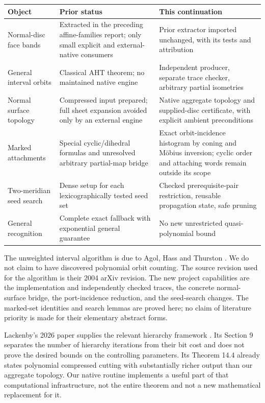 \documentclass[11pt,a4paper]{article}
\theoremstyle{definition}\newtheorem{definition}[theorem]{Definition}
\theoremstyle{remark}\newtheorem{remark}[theorem]{Remark}
\begin{document}
\begin{center}\small
\begin{tabularx}{\textwidth}{@{}p{}XX@{}}
\toprule
Object & Prior status & This continuation\\\midrule
Normal-disc face bands & Extracted in the preceding affine-families report;
only small explicit and external-native consumers & Prior extractor imported
unchanged, with its tests and attribution\\
General interval orbits & Classical AHT theorem; no maintained native engine &
Independent producer, separate trace checker, arbitrary partial isometries\\
Normal surface topology & Compressed input prepared; full sheet expansion
avoided only by an external engine & Native aggregate topology and supplied-disc
certificate, with explicit ambient preconditions\\
Marked attachments & Special cyclic/dihedral formulas and unresolved arbitrary
partial-map bridge & Exact orbit-incidence histogram by coning and M\"obius
inversion; cyclic order and attaching words remain outside its scope\\
Two-meridian seed search & Dense setup for each lexicographically tested seed set &
Checked prerequisite-pair restriction, reusable propagation state, safe pruning\\
General recognition & Complete exact fallback with exponential general guarantee &
No new unrestricted quasi-polynomial bound\\\bottomrule
\end{tabularx}
\end{center}

The unweighted interval algorithm is due to Agol, Hass and Thurston
\cite{aht}. We do not claim to have discovered polynomial orbit counting.
The source revision used for the algorithm is their 2004 arXiv revision.
The new project capabilities are the implementation and independently checked
traces, the concrete normal-surface bridge, the port-incidence reduction,
and the seed-search changes. The marked-set identities and search lemmas are
proved here; no claim of literature priority is made for their elementary
abstract forms.

Lackenby's 2026 paper supplies the relevant hierarchy framework
\cite{lackenby2026}. Its Section 9 separates the number of hierarchy iterations
from their bit cost and does not prove the desired bounds on the controlling
parameters. Its Theorem 14.4 already states polynomial compressed cutting
with substantially richer output than our aggregate topology. Our native
routine implements a useful part of that computational infrastructure, not
the entire theorem and not a new mathematical replacement for it.
\end{document}
